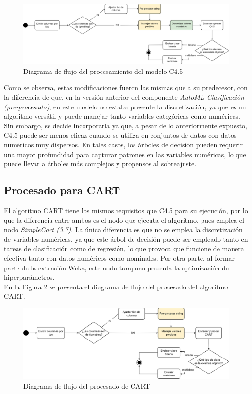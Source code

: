 \begin{figure}[h]
	\centering
	\includegraphics[width=1\linewidth]{"figuras/capi 2/modelos/procesado c4pt5.drawio"}
	\caption{Diagrama de flujo del procesamiento del modelo C4.5}
	\label{fig:procesado-c4pt5}
\end{figure}

Como se observa, estas modificaciones fueron las mismas que a su predecesor, con la diferencia de que, en la versión anterior del componente \textit{AutoML Clasificación (pre-procesado)}, en este modelo no estaba presente la discretización, ya que es un algoritmo versátil y puede manejar tanto variables categóricas como numéricas. Sin embargo, se decide incorporarla ya que, a pesar de lo anteriormente expuesto, C4.5 puede ser menos eficaz cuando se utiliza en conjuntos de datos con datos numéricos muy dispersos. En tales casos, los árboles de decisión pueden requerir una mayor profundidad para capturar patrones en las variables numéricas, lo que puede llevar a árboles más complejos y propensos al sobreajuste. 

\subsection{Procesado para CART}
El algoritmo CART tiene los mismos requisitos que C4.5 para su ejecución, por lo que la diferencia entre ambos es el nodo que ejecuta el algoritmo, pues emplea el nodo \textit{SimpleCart (3.7)}. La única diferencia es que no se emplea la discretización de variables numéricas, ya que este árbol de decisión puede ser empleado tanto en tareas de clasificación como de regresión, lo que provoca que funcione de manera efectiva tanto con datos numéricos como nominales. Por otra parte, al formar parte de la extensión Weka, este nodo tampoco presenta la optimización de hiperparámetros. \\
En la Figura \ref{fig:procesado-cart} se presenta el diagrama de flujo del procesado del algoritmo CART.

\begin{figure}[H]
	\centering
	\includegraphics[width=1\linewidth]{"figuras/capi 2/modelos/procesado cart.drawio"}
	\caption{Diagrama de flujo del procesado de CART}
	\label{fig:procesado-cart}
\end{figure}


